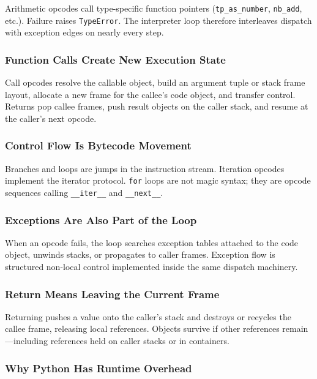 Arithmetic opcodes call type-specific function pointers (\texttt{tp\_as\_number}, \texttt{nb\_add}, etc.). Failure raises \texttt{TypeError}. The interpreter loop therefore interleaves dispatch with exception edges on nearly every step.

\subsubsection{Function Calls Create New Execution State}

Call opcodes resolve the callable object, build an argument tuple or stack frame layout, allocate a new frame for the callee's code object, and transfer control. Returns pop callee frames, push result objects on the caller stack, and resume at the caller's next opcode.

\subsubsection{Control Flow Is Bytecode Movement}

Branches and loops are jumps in the instruction stream. Iteration opcodes implement the iterator protocol. \texttt{for} loops are not magic syntax; they are opcode sequences calling \texttt{\_\_iter\_\_} and \texttt{\_\_next\_\_}.

\subsubsection{Exceptions Are Also Part of the Loop}

When an opcode fails, the loop searches exception tables attached to the code object, unwinds stacks, or propagates to caller frames. Exception flow is structured non-local control implemented inside the same dispatch machinery.

\subsubsection{Return Means Leaving the Current Frame}

Returning pushes a value onto the caller's stack and destroys or recycles the callee frame, releasing local references. Objects survive if other references remain---including references held on caller stacks or in containers.

\subsubsection{Why Python Has Runtime Overhead}

